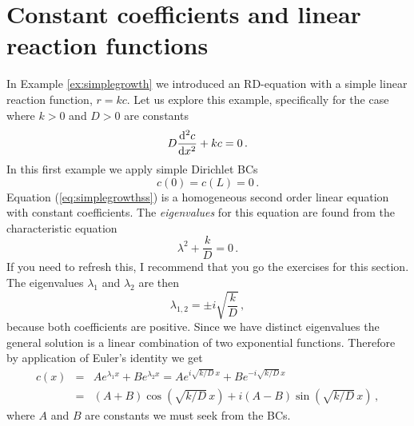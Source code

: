 \section{Constant coefficients and linear reaction functions \label{sect:stst:BVP}}
In Example \ref{ex:simplegrowth} we introduced an RD-equation with a simple 
linear reaction function, $r=kc$. Let us explore this example, specifically for the case 
where $k>0$ and $D>0$ are constants  
\begin{equation}
  \label{eq:simplegrowthss}
	D\frac{\mathrm{d}^2c}{\mathrm{d} x^2} + kc=0 \, .
\end{equation}
In this first example we apply simple Dirichlet BCs
\begin{equation}
  c(0)=c(L)=0 \, .
\end{equation}
Equation (\ref{eq:simplegrowthss}) is a homogeneous second order linear equation with 
constant coefficients. The \emph{eigenvalues}  for this equation are found from
the characteristic equation
\begin{equation}
	\lambda^2 + \frac{k}{D} = 0 \, .
	\label{eq:eigInfinite}
\end{equation}
If you need to refresh this, I recommend that you go the exercises for this section.
The  eigenvalues $\lambda_1$ and $\lambda_2$ are then
\begin{equation}
 \lambda_{1,2} = \pm i \sqrt{\frac{k}{D}}   \, ,
\end{equation}
because both coefficients are positive. Since we have distinct eigenvalues 
the general solution is a linear combination of two exponential functions. Therefore 
by application of Euler's identity we get
\begin{eqnarray}
	c(x) &=& Ae^{\lambda_1 x} + Be^{\lambda_2 x} = A e^{i \sqrt{k/D} \, x} + B e^{-i \sqrt{k/D} \, x}
           \nonumber \\
       &=& (A+B)\cos\left(\sqrt{k/D}\,x\right) +
           i(A-B)\sin\left(\sqrt{k/D}\,x\right) \, ,
		   \label{eq:stsgeneral2order}
\end{eqnarray}
where $A$ and $B$ are constants we must seek from the BCs. 

